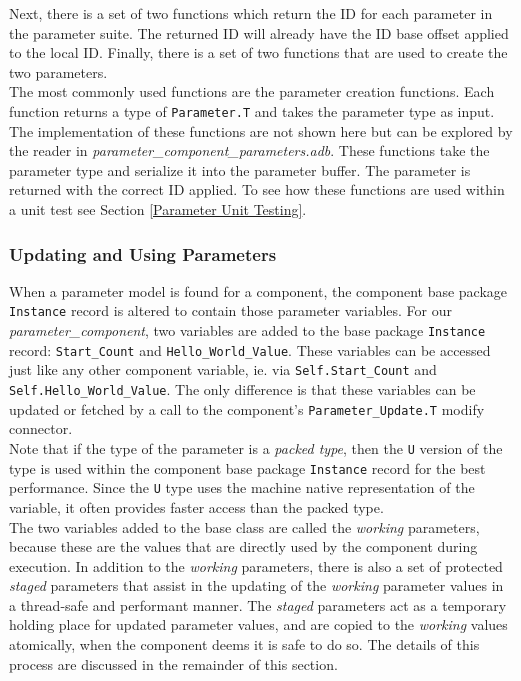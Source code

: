 Next, there is a set of two functions which return the ID for each parameter in the parameter suite. The returned ID will already have the ID base offset applied to the local ID. Finally, there is a set of two functions that are used to create the two parameters. \\

The most commonly used functions are the parameter creation functions. Each function returns a type of \texttt{Parameter.T} and takes the parameter type as input. The implementation of these functions are not shown here but can be explored by the reader in \textit{parameter\_component\_parameters.adb}. These functions take the parameter type and serialize it into the parameter buffer. The parameter is returned with the correct ID applied. To see how these functions are used within a unit test see Section \ref{Parameter Unit Testing}.

\subsubsection{Updating and Using Parameters}

When a parameter model is found for a component, the component base package \texttt{Instance} record is altered to contain those parameter variables. For our \textit{parameter\_component}, two variables are added to the base package \texttt{Instance} record: \texttt{Start\_Count} and \texttt{Hello\_World\_Value}. These variables can be accessed just like any other component variable, ie. via \texttt{Self.Start\_Count} and \texttt{Self.Hello\_World\_Value}. The only difference is that these variables can be updated or fetched by a call to the component's \texttt{Parameter\_Update.T} modify connector. \\

Note that if the type of the parameter is a \textit{packed type}, then the \texttt{U} version of the type is used within the component base package \texttt{Instance} record for the best performance. Since the \texttt{U} type uses the machine native representation of the variable, it often provides faster access than the packed type. \\

The two variables added to the base class are called the \textit{working} parameters, because these are the values that are directly used by the component during execution. In addition to the \textit{working} parameters, there is also a set of protected \textit{staged} parameters that assist in the updating of the \textit{working} parameter values in a thread-safe and performant manner. The \textit{staged} parameters act as a temporary holding place for updated parameter values, and are copied to the \textit{working} values atomically, when the component deems it is safe to do so. The details of this process are discussed in the remainder of this section. \\

